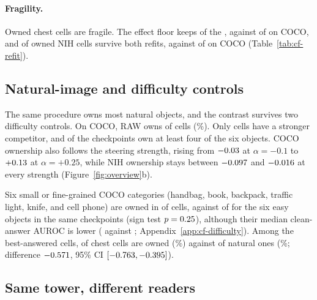 \documentclass[11pt]{article}
\begin{document}
\paragraph{Fragility.} Owned chest cells are fragile. The effect floor keeps \cfChestFloored{} of the \cfChestOwned{}, against \cfCocoFloored{} of \cfCocoOwned{} on COCO, and \cfRefitGradeStableNih{} of \cfRefitGradeOwnedNih{} owned NIH cells survive both refits, against \cfRefitGradeStableCoco{} of \cfRefitGradeOwnedCoco{} on COCO (Table~\ref{tab:cf-refit}).

\subsection{Natural-image and difficulty controls}
\label{sec:coco}

The same procedure owns most natural objects, and the contrast survives two difficulty controls. On COCO, RAW owns \cfCocoOwned{} of \cfCocoOwnedN{} cells (\cfCocoOwnedPct\%). Only \cfCocoCompetitor{} cells have a stronger competitor, and \cfCocoBlocksFourPlus{} of the \cfCocoBlocks{} checkpoints own at least four of the six objects. COCO ownership also follows the steering strength, rising from $-0.03$ at $\alpha=-0.1$ to $+0.13$ at $\alpha=+0.25$, while NIH ownership stays between $-0.097$ and $-0.016$ at every strength (Figure~\ref{fig:overview}b).

Six small or fine-grained COCO categories (handbag, book, backpack, traffic light, knife, and cell phone) are owned in \cfFgFineOwned{} of \cfFgFineCells{} cells, against \cfFgEasySameOwned{} of \cfFgEasySameCells{} for the six easy objects in the same checkpoints (sign test $p=0.25$), although their median clean-answer AUROC is lower (\cfFgFineAuroc{} against \cfFgEasySameAuroc{}; Appendix~\ref{app:cf-difficulty}). Among the best-answered cells, \cfStratChestTopOwned{} of \cfStratChestTopN{} chest cells are owned (\cfStratChestTopPct\%) against \cfStratNatTopOwned{} of \cfStratNatTopN{} natural ones (\cfStratNatTopPct\%; difference $-0.571$, 95\% CI $[-0.763,-0.395]$).

\subsection{Same tower, different readers}
\label{sec:reader}
\end{document}
